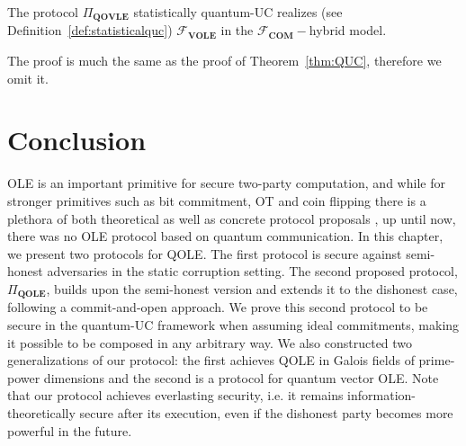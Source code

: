 \begin{theorem}

The protocol $\Pi_{\textbf{QOVLE}}$ statistically quantum-UC realizes  (see Definition~\ref{def:statisticalquc}) $\mathcal{F}_{\textbf{VOLE}}$ in the $\mathcal{F}_{\textbf{COM}}-$hybrid model.
\label{thm:QUC-VOLE}
\end{theorem}

The proof is much the same as the proof of Theorem~\ref{thm:QUC}, therefore we omit it.


\section{Conclusion} 

OLE is an important primitive for secure two-party computation, and while for stronger primitives such as bit commitment, OT  and coin flipping there is a plethora of both theoretical as well as concrete protocol proposals \cite{M05, MTVUZ05, BBBG09, BBBGST11, DV12, SG12, KWW12, NJCKW12, KC13, PJLCLTKD14, LAAPMP14, LAPPP16, ARW19, BCKD20,  SY20,  ARV21,  SMP22}, up until now, there was no OLE protocol based on quantum communication. In this chapter, we present two protocols for QOLE. The first protocol is secure against semi-honest adversaries in the static corruption setting. The second proposed protocol, $\Pi_{\textbf{QOLE}}$, builds upon the semi-honest version and extends it to the dishonest case, following a commit-and-open approach. We prove this second protocol to be secure in the quantum-UC framework when assuming ideal commitments, making it possible to be composed in any arbitrary way. We also constructed two generalizations of our protocol: the first achieves QOLE in Galois fields of prime-power dimensions and the second is a protocol for quantum vector OLE.
 Note that our protocol achieves everlasting security, i.e. it remains information-theoretically secure after its execution, even if the dishonest party becomes more powerful in the future.

%
%
%
